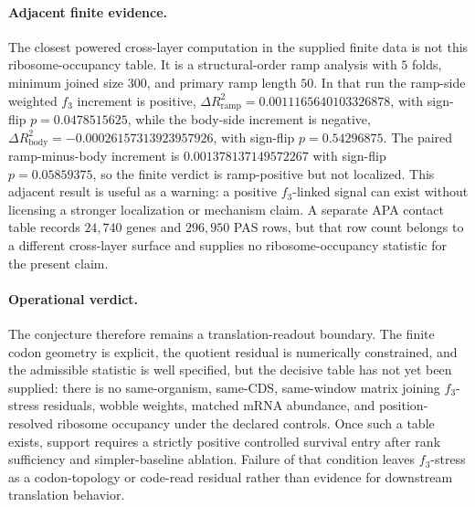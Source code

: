 \paragraph{Adjacent finite evidence.}
The closest powered cross-layer computation in the supplied finite data is not this ribosome-occupancy table. It is a structural-order ramp analysis with $5$ folds, minimum joined size $300$, and primary ramp length $50$. In that run the ramp-side weighted $f_3$ increment is positive, $\Delta R^2_{\mathrm{ramp}}=0.0011165640103326878$, with sign-flip $p=0.0478515625$, while the body-side increment is negative, $\Delta R^2_{\mathrm{body}}=-0.00026157313923957926$, with sign-flip $p=0.54296875$. The paired ramp-minus-body increment is $0.001378137149572267$ with sign-flip $p=0.05859375$, so the finite verdict is ramp-positive but not localized. This adjacent result is useful as a warning: a positive $f_3$-linked signal can exist without licensing a stronger localization or mechanism claim. A separate APA contact table records $24{,}740$ genes and $296{,}950$ PAS rows, but that row count belongs to a different cross-layer surface and supplies no ribosome-occupancy statistic for the present claim.

\paragraph{Operational verdict.}
The conjecture therefore remains a translation-readout boundary. The finite codon geometry is explicit, the quotient residual is numerically constrained, and the admissible statistic is well specified, but the decisive table has not yet been supplied: there is no same-organism, same-CDS, same-window matrix joining $f_3$-stress residuals, wobble weights, matched mRNA abundance, and position-resolved ribosome occupancy under the declared controls. Once such a table exists, support requires a strictly positive controlled survival entry after rank sufficiency and simpler-baseline ablation. Failure of that condition leaves $f_3$-stress as a codon-topology or code-read residual rather than evidence for downstream translation behavior.

